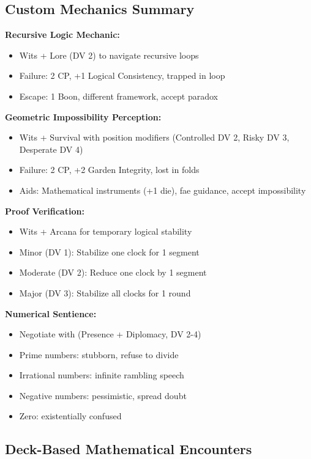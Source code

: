 \documentclass[11pt]{article}
\begin{document}
\subsection*{Custom Mechanics Summary}

\textbf{Recursive Logic Mechanic:}
\begin{itemize}
\item Wits + Lore (DV 2) to navigate recursive loops
\item Failure: 2 CP, +1 Logical Consistency, trapped in loop
\item Escape: 1 Boon, different framework, accept paradox
\end{itemize}

\textbf{Geometric Impossibility Perception:}
\begin{itemize}
\item Wits + Survival with position modifiers (Controlled DV 2, Risky DV 3, Desperate DV 4)
\item Failure: 2 CP, +2 Garden Integrity, lost in folds
\item Aids: Mathematical instruments (+1 die), fae guidance, accept impossibility
\end{itemize}

\textbf{Proof Verification:}
\begin{itemize}
\item Wits + Arcana for temporary logical stability
\item Minor (DV 1): Stabilize one clock for 1 segment
\item Moderate (DV 2): Reduce one clock by 1 segment
\item Major (DV 3): Stabilize all clocks for 1 round
\end{itemize}

\textbf{Numerical Sentience:}
\begin{itemize}
\item Negotiate with (Presence + Diplomacy, DV 2-4)
\item Prime numbers: stubborn, refuse to divide
\item Irrational numbers: infinite rambling speech
\item Negative numbers: pessimistic, spread doubt
\item Zero: existentially confused
\end{itemize}

\subsection*{Deck-Based Mathematical Encounters}
\end{document}
